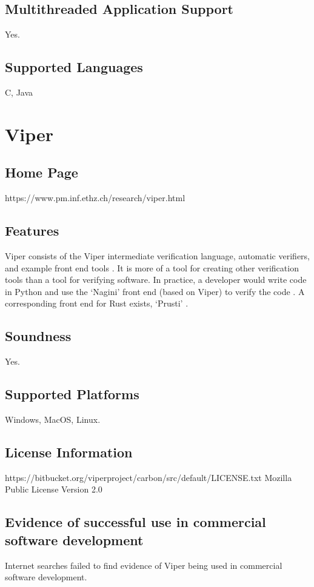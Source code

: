\documentclass[12pt,openany,a4paper]{book}
\begin{document}
	\subsection{Multithreaded Application Support}
	Yes.
	\subsection{Supported Languages}
	C, Java









\section{Viper}
	\subsection{Home Page}%
https://www.pm.inf.ethz.ch/research/viper.html
	\subsection{Features}
		Viper consists of the Viper intermediate verification language, automatic verifiers, and example front end tools \cite{viper01}. It is more of a tool for creating other verification tools than a tool for verifying software. In practice, a developer would write code in Python and use the `Nagini' front end (based on Viper) to verify the code \cite{Eilers2018NaginiAS}. A corresponding front end for Rust exists, `Prusti' \cite{AstrauskasMuellerPoliSummers19}.
	\subsection{Soundness}
		Yes.
	\subsection{Supported Platforms}
		Windows, MacOS, Linux\cite{JuhaszUri2014VAVI}.
	\subsection{License Information}
	https://bitbucket.org/viperproject/carbon/src/default/LICENSE.txt
		Mozilla Public License Version 2.0\cite{viperlicense}
	\subsection{Evidence of successful use in commercial software development}
		Internet searches failed to find evidence of Viper being used in commercial software development.
\end{document}
